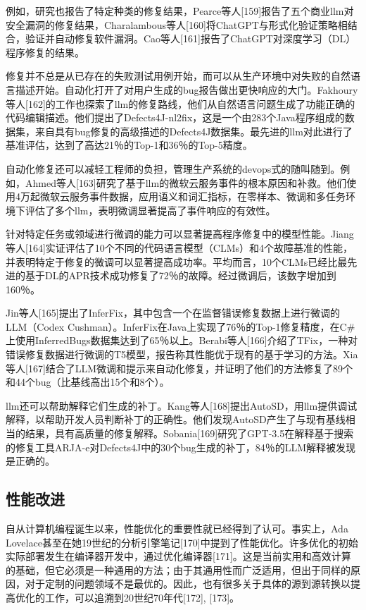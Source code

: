 \begin{translation}
例如，研究也报告了特定种类的修复结果，Pearce等人[159]报告了五个商业llm对安全漏洞的修复结果，Charalambous等人[160]将ChatGPT与形式化验证策略相结合，验证并自动修复软件漏洞。Cao等人[161]报告了ChatGPT对深度学习（DL）程序修复的结果。

修复并不总是从已存在的失败测试用例开始，而可以从生产环境中对失败的自然语言描述开始。自动化打开了对用户生成的bug报告做出更快响应的大门。Fakhoury等人[162]的工作也探索了llm的修复路线，他们从自然语言问题生成了功能正确的代码编辑描述。他们提出了Defects4J-nl2fix，这是一个由283个Java程序组成的数据集，来自具有bug修复的高级描述的Defects4J数据集。最先进的llm对此进行了基准评估，达到了高达21％的Top-1和36％的Top-5精度。

自动化修复还可以减轻工程师的负担，管理生产系统的devops式的随叫随到。例如，Ahmed等人[163]研究了基于llm的微软云服务事件的根本原因和补救。他们使用4万起微软云服务事件数据，应用语义和词汇指标，在零样本、微调和多任务环境下评估了多个llm，表明微调显著提高了事件响应的有效性。

针对特定任务或领域进行微调的能力可以显著提高程序修复中的模型性能。Jiang等人[164]实证评估了10个不同的代码语言模型（CLMs）和4个故障基准的性能，并表明特定于修复的微调可以显著提高成功率。平均而言，10个CLMs已经比最先进的基于DL的APR技术成功修复了72％的故障。经过微调后，该数字增加到160％。

Jin等人[165]提出了InferFix，其中包含一个在监督错误修复数据上进行微调的LLM（Codex Cushman）。InferFix在Java上实现了76％的Top-1修复精度，在C\#上使用InferredBugs数据集达到了65％以上。Berabi等人[166]介绍了TFix，一种对错误修复数据进行微调的T5模型，报告称其性能优于现有的基于学习的方法。Xia等人[167]结合了LLM微调和提示来自动化修复，并证明了他们的方法修复了89个和44个bug（比基线高出15个和8个）。

llm还可以帮助解释它们生成的补丁。Kang等人[168]提出AutoSD，用llm提供调试解释，以帮助开发人员判断补丁的正确性。他们发现AutoSD产生了与现有基线相当的结果，具有高质量的修复解释。Sobania[169]研究了GPT-3.5在解释基于搜索的修复工具ARJA-e对Defects4J中的30个bug生成的补丁，84％的LLM解释被发现是正确的。

\subsection{性能改进}

自从计算机编程诞生以来，性能优化的重要性就已经得到了认可。事实上，Ada Lovelace甚至在她19世纪的分析引擎笔记[170]中提到了性能优化。许多优化的初始实际部署发生在编译器开发中，通过优化编译器[171]。这是当前实用和高效计算的基础，但它必须是一种通用的方法；由于其通用性而广泛适用，但出于同样的原因，对于定制的问题领域不是最优的。因此，也有很多关于具体的源到源转换以提高优化的工作，可以追溯到20世纪70年代[172], [173]。


\end{translation}
